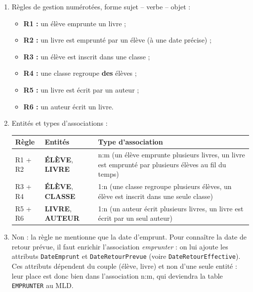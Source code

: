 \documentclass[11pt]{article}
\begin{document}
\begin{corrige}
\begin{enumerate}
  \item Règles de gestion numérotées, forme sujet -- verbe -- objet :
  \begin{itemize}
    \item \textbf{R1 :} un élève emprunte un livre ;
    \item \textbf{R2 :} un livre est emprunté par un élève (à une date précise) ;
    \item \textbf{R3 :} un élève est inscrit dans une classe ;
    \item \textbf{R4 :} une classe regroupe \textbf{des} élèves ; %
    \item \textbf{R5 :} un livre est écrit par un auteur ;
    \item \textbf{R6 :} un auteur écrit un livre.
  \end{itemize}
  \item Entités et types d'associations :
  \begin{center}
  \begin{tabularx}{\linewidth}{|l|l|X|}\hline
  \rowcolor{popblueL} \textbf{Règle} & \textbf{Entités} & \textbf{Type d'association} \\ \hline
  R1 + R2 & \textbf{ÉLÈVE}, \textbf{LIVRE} & n:m (un élève emprunte plusieurs livres, un livre est emprunté par plusieurs élèves au fil du temps) \\ \hline
  R3 + R4 & \textbf{ÉLÈVE}, \textbf{CLASSE} & 1:n (une classe regroupe plusieurs élèves, un élève est inscrit dans une seule classe) \\ \hline
  R5 + R6 & \textbf{LIVRE}, \textbf{AUTEUR} & 1:n (un auteur écrit plusieurs livres, un livre est écrit par un seul auteur) \\ \hline
  \end{tabularx}
  \end{center}
  \item Non : la règle ne mentionne que la date d'emprunt. Pour connaître la date de retour prévue, il faut enrichir l'association \emph{emprunter} : on lui ajoute les attributs \texttt{DateEmprunt} et \texttt{DateRetourPrevue} (voire \texttt{DateRetourEffective}). Ces attributs dépendent du couple (élève, livre) et non d'une seule entité : leur place est donc bien dans l'association n:m, qui deviendra la table \texttt{EMPRUNTER} au MLD.
\end{enumerate}
\end{corrige}
\end{document}
